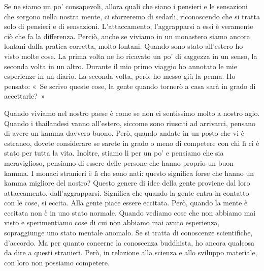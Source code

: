 Se ne siamo un po' consapevoli, allora quali che siano i pensieri e le
sensazioni che sorgono nella nostra mente, ci sforzeremo di sedarli,
riconoscendo che si tratta solo di pensieri e di sensazioni.
L'attaccamento, l'aggrapparsi a essi è veramente ciò che fa la
differenza. Perciò, anche se viviamo in un monastero siamo ancora
lontani dalla pratica corretta, molto lontani. Quando sono stato
all'estero ho visto molte cose. La prima volta ne ho ricavato un po' di
saggezza in un senso, la seconda volta in un altro. Durante il mio primo
viaggio ho annotato le mie esperienze in un diario. La seconda volta,
però, ho messo giù la penna. Ho pensato: «~Se scrivo queste cose, la
gente quando tornerò a casa sarà in grado di accettarle?~»

Quando viviamo nel nostro paese è come se non ci sentissimo molto a
nostro agio. Quando i thailandesi vanno all'estero, siccome sono
riusciti ad arrivarci, pensano di avere un kamma davvero buono.
Però, quando andate in un posto che vi è estraneo, dovete considerare se
sarete in grado o meno di competere con chi lì ci è stato per tutta la
vita. Inoltre, stiamo lì per un po' e pensiamo che sia meraviglioso,
pensiamo di essere delle persone che hanno proprio un buon kamma.
I monaci stranieri è lì che sono nati: questo significa forse che hanno
un kamma migliore del nostro? Questo genere di idee della gente
proviene dal loro attaccamento, dall'aggrapparsi. Significa che quando
la gente entra in contatto con le cose, si eccita. Alla gente piace
essere eccitata. Però, quando la mente è eccitata non è in uno stato
normale. Quando vediamo cose che non abbiamo mai visto e sperimentiamo
cose di cui non abbiamo mai avuto esperienza, sopraggiunge uno stato
mentale anomalo. Se si tratta di conoscenze scientifiche, d'accordo. Ma
per quanto concerne la conoscenza buddhista, ho ancora qualcosa da dire
a questi stranieri. Però, in relazione alla scienza e allo sviluppo
materiale, con loro non possiamo competere.

